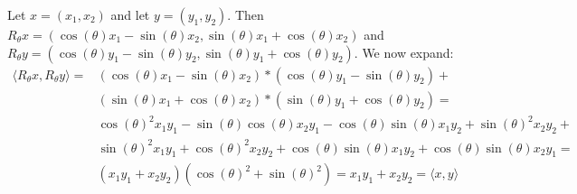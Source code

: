 \documentclass[12pt]{article}
\newenvironment{problem}[2][Problem]{\begin{trivlist}
\item[\hskip \labelsep {\bfseries #1}\hskip \labelsep {\bfseries #2}]}{\end{trivlist}}
\begin{document}
\begin{problem}{9.} Let $x = (x_1, x_2)$ and let $y = (y_1, y_2)$. Then $R_\theta x = (\cos(\theta)x_1-\sin(\theta)x_2, \sin(\theta)x_1 + \cos(\theta)x_2)$ and $R_\theta y = (\cos(\theta)y_1-\sin(\theta)y_2, \sin(\theta)y_1 + \cos(\theta)y_2)$. We now expand: 
\begin{equation*}
\begin{aligned}
\langle R_\theta x, R_\theta y \rangle = & (\cos(\theta)x_1-\sin(\theta)x_2)*(\cos(\theta)y_1-\sin(\theta)y_2) + \\& (\sin(\theta)x_1 + \cos(\theta)x_2)*(\sin(\theta)y_1 + \cos(\theta)y_2)
= \\ 
& \cos(\theta)^2x_1y_1 - \sin(\theta)\cos(\theta)x_2y_1 - \cos(\theta)\sin(\theta)x_1y_2 + \sin(\theta)^2x_2y_2 + \\
&  \sin(\theta)^2x_1y_1 + \cos(\theta)^2x_2 y_2 + \cos(\theta)\sin(\theta)x_1y_2 + \cos(\theta)\sin(\theta)x_2y_1 = \\
& (x_1y_1 + x_2y_2)( \cos(\theta)^2 + \sin(\theta)^2)  =  x_1y_1 + x_2y_2 = \langle x, y \rangle
\end{aligned}
\end{equation*}
\end{problem}
\end{document}
